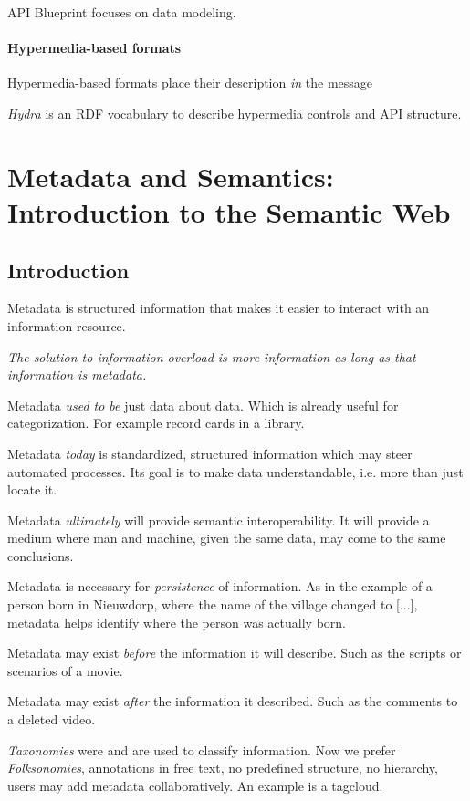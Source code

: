 \documentclass{report}
\begin{document}
API Blueprint focuses on data modeling.

\subsubsection{Hypermedia-based formats}

Hypermedia-based formats place
their description \emph{in} the message

\textit{Hydra} is an RDF vocabulary
to describe hypermedia controls and API structure.

\chapter{Metadata and Semantics: Introduction to the Semantic Web}

\section{Introduction}

Metadata is structured information
that makes it easier to interact
with an information resource.

\textit{
  The solution to information overload is more information
  as long as that information is metadata.
}

Metadata \emph{used to be} just data about data.
Which is already useful for categorization.
For example record cards in a library.

Metadata \emph{today} is standardized, structured information
which may steer automated processes.
Its goal is to make data understandable,
i.e. more than just locate it.

Metadata \emph{ultimately} will provide semantic interoperability.
It will provide a medium where man and machine,
given the same data, may come to the same conclusions.

Metadata is necessary for \textit{persistence} of information.
As in the example of a person born in Nieuwdorp,
where the name of the village changed to [...],
metadata helps identify where the person was actually born.

Metadata may exist \emph{before} the information it will describe.
Such as the scripts or scenarios of a movie.

Metadata may exist \emph{after} the information it described.
Such as the comments to a deleted video.

\textit{Taxonomies} were and are used to classify information.
Now we prefer \textit{Folksonomies}, annotations in free text,
no predefined structure, no hierarchy,
users may add metadata collaboratively.
An example is a tagcloud.
\end{document}
